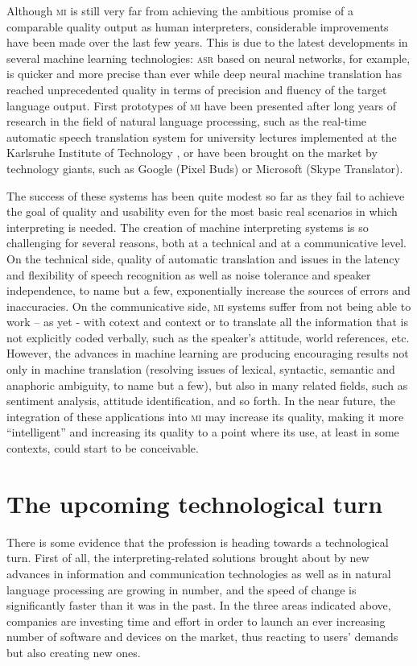 \documentclass[output=paper]{langsci/langscibook}
\begin{document}
Although \textsc{mi} is still very far from achieving  the ambitious promise of a comparable quality output as human interpreters, considerable improvements have been made over the last few years. This is due to the latest developments in several machine learning technologies: \textsc{asr} based on neural networks, for example, is quicker and more precise than ever while deep neural machine translation has reached unprecedented quality in terms of precision and fluency of the target language output. First prototypes of \textsc{mi} have been presented after long years of research in the field of natural language processing, such as the real-time automatic speech translation system for university lectures implemented at the Karlsruhe Institute of Technology \citep{muller_lecture_2016}, or have been brought on the market by technology giants, such as Google (Pixel Buds) or Microsoft (Skype Translator).  
 
The success of these systems has been quite modest so far as they fail to achieve the goal of quality and usability even for the most basic real scenarios in which interpreting is needed. The creation of machine interpreting systems is so challenging for several reasons, both at a technical and at a communicative level. On the technical side, quality of automatic translation and issues in the latency and flexibility of speech recognition as well as noise tolerance and speaker independence, to name but a few, exponentially increase the sources of errors and inaccuracies. On the communicative side, \textsc{mi} systems suffer from not being able to work – as yet - with cotext and context or to translate all the information that is not explicitly coded verbally, such as the speaker's attitude, world references, etc. However, the advances in machine learning are producing encouraging results not only in machine translation (resolving issues of lexical, syntactic, semantic and anaphoric ambiguity, to name but a few), but also in many related fields, such as sentiment analysis, attitude identification, and so forth. In the near future, the integration of these applications into \textsc{mi} may increase its quality, making it more ``intelligent'' and increasing its quality to a point where its use, at least in some contexts, could start to be conceivable.
 
\section{The upcoming technological turn} 
There is some evidence that the profession is heading towards a technological turn. First of all, the interpreting-related solutions brought about by new advances in information and communication technologies as well as in natural language processing are growing in number, and the speed of change is significantly faster than it was in the past. In the three areas indicated above, companies are investing time and effort in order to launch an ever increasing number of software and devices on the market, thus reacting to users’ demands but also creating new ones.
 
\end{document}
